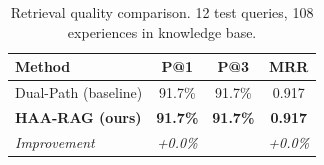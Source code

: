 \begin{table}[t]
\centering
\caption{Retrieval quality comparison. 12 test queries, 108 experiences in knowledge base.}
\label{tab:haarag}
\begin{tabular}{@{}lccc@{}}
\toprule
\textbf{Method} & \textbf{P@1} & \textbf{P@3} & \textbf{MRR} \\
\midrule
Dual-Path (baseline) & 91.7\% & 91.7\% & 0.917 \\
\textbf{HAA-RAG (ours)} & \textbf{91.7\%} & \textbf{91.7\%} & \textbf{0.917} \\
\midrule
\textit{Improvement} & \textit{+0.0\%} & & \textit{+0.0\%} \\
\bottomrule
\end{tabular}
\end{table}